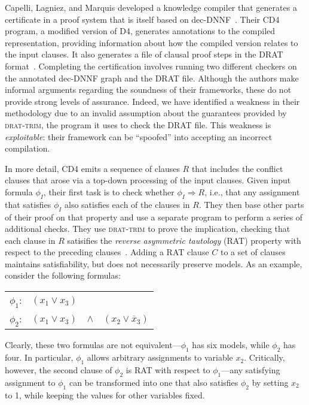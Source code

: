 \documentclass[letterpaper,USenglish,cleveref, autoref, thm-restate]{lipics-v2021}
\newcommand{\obar}[1]{\overline{#1}}
\newcommand{\imply}{\Rightarrow}
\newcommand{\progname}[1]{\textsc{#1}}
\newcommand{\dfour}{\progname{D4}}
\newcommand{\cdfour}{\progname{CD4}}
\newcommand{\dtrim}{\progname{drat-trim}}
\begin{document}
Capelli, Lagniez, and Marquis developed a knowledge compiler that
generates a certificate in a proof system that is itself based on
dec-DNNF~\cite{capelli:sat:2019,capelli:aaai:2021}.  Their \cdfour{}
program, a modified version of \dfour{}, generates annotations to the
compiled representation, providing information about how the compiled
version relates to the input clauses.  It also generates a file of
clausal proof steps in the DRAT format~\cite{wetzler14_drattrim}.
Completing the certification involves running two different checkers
on the annotated dec-DNNF graph and the DRAT file.  Although the
authors make informal arguments regarding the soundness of their
frameworks, these do not provide strong levels of assurance.  Indeed,
we have identified a weakness in their methodology due to an
invalid assumption about the guarantees provided by \dtrim{}, the
program it uses to check the DRAT file.  This weakness is
\emph{exploitable}: their framework can be ``spoofed'' into accepting
an incorrect compilation.

In more detail, \cdfour{} emits a sequence of clauses $R$ that
includes the conflict clauses that arose via a top-down processing of
the input clauses.  Given input formula $\phi_I$, their first task is to
check whether $\phi_I \imply R$, i.e., that any assignment that satisfies $\phi_I$ also satisfies each of the clauses in $R$.
They then base other parts of their proof on that
property and use a separate program to perform a series of additional
checks.  They use \dtrim{} to prove the implication, checking that each clause in $R$
satisifies the \emph{reverse asymmetric tautology} (RAT) property with
respect to the preceding
clauses~\cite{heule:cade:2013,jarvisalo:ijcar:2012}.  Adding a RAT
clause $C$ to a set of clauses maintains satisfiability, but does not necessarily
preserve models.  As an example, consider the following formulas:
\begin{center}
  \begin{tabular}{lccc}
    $\phi_1$: & $(x_1 \lor x_3)$ & & \\
    $\phi_2$: & $(x_1 \lor x_3)$ & $\land$ & $(x_2 \lor \obar{x}_3)$\\
  \end{tabular}
\end{center}
Clearly, these two formulas are not equivalent---$\phi_1$ has six
models, while $\phi_2$ has four.  In particular, $\phi_1$ allows
arbitrary assignments to variable $x_2$.  Critically, however, the
second clause of $\phi_2$ is RAT with respect to $\phi_1$---any
satisfying assignment to $\phi_1$ can be transformed into one that
also satisfies $\phi_2$ by setting $x_2$ to 1, while keeping the values for other variables fixed.
\end{document}
